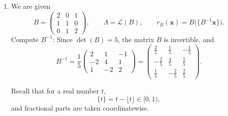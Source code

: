 \newpage
\begin{enumerate}
	\item[\textbf{29-33}] 
	We are given
\[
B=
\begin{pmatrix}
	2&0&1\\
	1&1&0\\
	0&1&2
\end{pmatrix},
\qquad
\Lambda=\mathcal L(B),
\qquad
r_B(\mathbf x)=B\bigl(\{B^{-1}\mathbf x\}\bigr).
\]
Compute \(B^{-1}\): Since $
\det(B)=5$, the matrix \(B\) is invertible, and
\[
B^{-1}
=
\frac15
\begin{pmatrix}
	2&1&-1\\
	-2&4&1\\
	1&-2&2
\end{pmatrix}
=
\begin{pmatrix}
	\frac25&\frac15&-\frac15\\[4pt]
	-\frac25&\frac45&\frac15\\[4pt]
	\frac15&-\frac25&\frac25
\end{pmatrix}.
\]

Recall that for a real number \(t\),
\[
\{t\}=t-\lfloor t\rfloor \in [0,1),
\]
and fractional parts are taken coordinatewise.
\end{enumerate}

